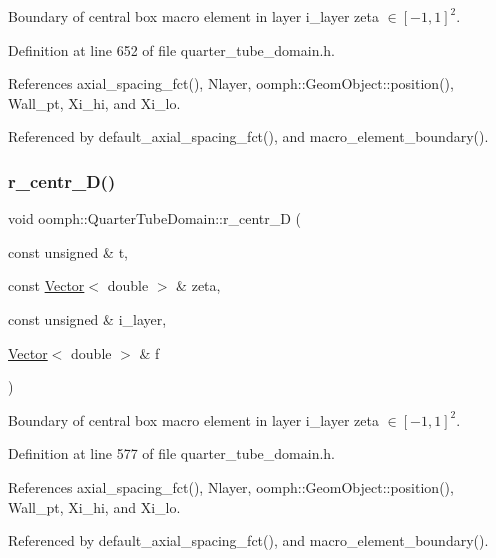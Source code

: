 Boundary of central box macro element in layer i\+\_\+layer zeta $ \in [-1,1]^2 $. 



Definition at line 652 of file quarter\+\_\+tube\+\_\+domain.\+h.



References axial\+\_\+spacing\+\_\+fct(), Nlayer, oomph\+::\+Geom\+Object\+::position(), Wall\+\_\+pt, Xi\+\_\+hi, and Xi\+\_\+lo.



Referenced by default\+\_\+axial\+\_\+spacing\+\_\+fct(), and macro\+\_\+element\+\_\+boundary().

\mbox{\label{classoomph_1_1QuarterTubeDomain_a4012aa5d6f8c535150823478164639c3}} 
\subsubsection{\texorpdfstring{r\+\_\+centr\+\_\+\+D()}{r\_centr\_D()}}
{\footnotesize\ttfamily void oomph\+::\+Quarter\+Tube\+Domain\+::r\+\_\+centr\+\_\+D (\begin{DoxyParamCaption}\item[{const unsigned \&}]{t,  }\item[{const \hyperlink{classoomph_1_1Vector}{Vector}$<$ double $>$ \&}]{zeta,  }\item[{const unsigned \&}]{i\+\_\+layer,  }\item[{\hyperlink{classoomph_1_1Vector}{Vector}$<$ double $>$ \&}]{f }\end{DoxyParamCaption})\hspace{0.3cm}{\ttfamily [private]}}



Boundary of central box macro element in layer i\+\_\+layer zeta $ \in [-1,1]^2 $. 



Definition at line 577 of file quarter\+\_\+tube\+\_\+domain.\+h.



References axial\+\_\+spacing\+\_\+fct(), Nlayer, oomph\+::\+Geom\+Object\+::position(), Wall\+\_\+pt, Xi\+\_\+hi, and Xi\+\_\+lo.



Referenced by default\+\_\+axial\+\_\+spacing\+\_\+fct(), and macro\+\_\+element\+\_\+boundary().

